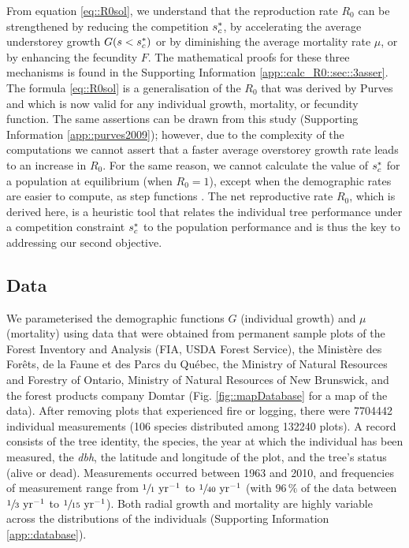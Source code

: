 From equation \eqref{eq::R0sol}, we understand that the reproduction rate $ R_0 $ can be strengthened by reducing the competition $ {s}^{*}_c $, by accelerating the average understorey growth $ G(s < {s}^{*}_c) $ or by diminishing the average mortality rate $ \mu $, or by enhancing the fecundity $ F $. The mathematical proofs for these three mechanisms is found in the Supporting Information \ref{app::calc_R0::sec::3asser}. The formula \eqref{eq::R0sol} is a generalisation of the $ R_0 $ that was derived by Purves and which is now valid for any individual growth, mortality, or fecundity function. The same assertions can be drawn from this study (Supporting Information \ref{app::purves2009}); however, due to the complexity of the computations we cannot assert that a faster average overstorey growth rate leads to an increase in $ R_0 $. For the same reason, we cannot calculate the value of $ {s}^{*}_c $ for a population at equilibrium (\ie when $ R_0 = 1 $), except when the demographic rates are easier to compute, as step functions \citep[Supporting Information \ref{app::purves2009} for the proof]{Purves2009}. The net reproductive rate $ R_0 $, which is derived here, is a heuristic tool that relates the individual tree performance under a competition constraint $ {s}^{*}_c $ to the population performance and is thus the key to addressing our second objective.

\subsection{Data}
We parameterised the demographic functions $ G $ (individual growth) and $ \mu $ (mortality) using data that were obtained from permanent sample plots of the Forest Inventory and Analysis (FIA, USDA Forest Service), the Ministère des Forêts, de la Faune et des Parcs du Québec, the Ministry of Natural Resources and Forestry of Ontario, Ministry of Natural Resources of New Brunswick, and the forest products company Domtar (Fig. \ref{fig::mapDatabase} for a map of the data). After removing plots that experienced fire or logging, there were \num{7704442} individual measurements (106 species distributed among \num{132240} plots). A record consists of the tree identity, the species, the year at which the individual has been measured, the \textit{\textit{dbh}}, the latitude and longitude of the plot, and the tree's status (alive or dead). Measurements occurred between 1963 and 2010, and frequencies of measurement range from $ \sfrac{1}{1} \text{ yr}^{-1} $ to $ \sfrac{1}{40} \text{ yr}^{-1} $ (with $ 96 \, \% $ of the data between $ \sfrac{1}{3} \text{ yr}^{-1} $ to $ \sfrac{1}{15} \text{ yr}^{-1} $). Both radial growth and mortality are highly variable across the distributions of the individuals (Supporting Information \ref{app::database}).

